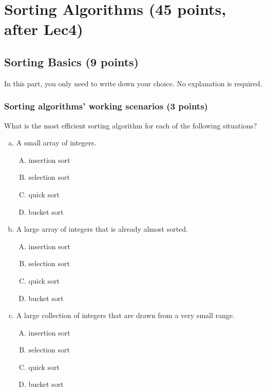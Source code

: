 \documentclass[11pt]{exam}
\begin{document}
\section{Sorting Algorithms (45 points, after Lec4)}

\subsection{Sorting Basics (9 points)}
{In this part, you only need to write down your choice. No explanation is required. }
\subsubsection{Sorting algorithms' working scenarios (3 points)}

What is the most efficient sorting algorithm for each of the following situations?
\begin{enumerate}[(a)]
    \item A small array of integers.
    \begin{enumerate}[A)]
        \item insertion sort
        \item selection sort
        \item quick sort
        \item bucket sort
    \end{enumerate}
    \begin{solution}
    \end{solution}
    
    \item A large array of integers that is already almost sorted.
    \begin{enumerate}[A)]
        \item insertion sort
        \item selection sort
        \item quick sort
        \item bucket sort
    \end{enumerate}
    \begin{solution}
    \end{solution}
    
    \item A large collection of integers that are drawn from a very small range.
    \begin{enumerate}[A)]
        \item insertion sort
        \item selection sort
        \item quick sort
        \item bucket sort
    \end{enumerate}
    \begin{solution}
    \end{solution}
\end{enumerate}
\end{document}
